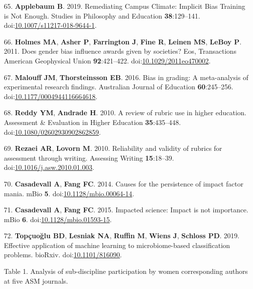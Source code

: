 \documentclass[11pt,]{article}
\begin{document}
\hypertarget{ref-applebaum_remediating_2019}{}
65. \textbf{Applebaum B}. 2019. Remediating Campus Climate: Implicit
Bias Training is Not Enough. Studies in Philosophy and Education
\textbf{38}:129--141.
doi:\href{https://doi.org/10.1007/s11217-018-9644-1}{10.1007/s11217-018-9644-1}.

\hypertarget{ref-Holmes2011}{}
66. \textbf{Holmes MA}, \textbf{Asher P}, \textbf{Farrington J},
\textbf{Fine R}, \textbf{Leinen MS}, \textbf{LeBoy P}. 2011. Does gender
bias influence awards given by societies? Eos, Transactions American
Geophysical Union \textbf{92}:421--422.
doi:\href{https://doi.org/10.1029/2011eo470002}{10.1029/2011eo470002}.

\hypertarget{ref-Malouff2016}{}
67. \textbf{Malouff JM}, \textbf{Thorsteinsson EB}. 2016. Bias in
grading: A meta-analysis of experimental research findings. Australian
Journal of Education \textbf{60}:245--256.
doi:\href{https://doi.org/10.1177/0004944116664618}{10.1177/0004944116664618}.

\hypertarget{ref-Reddy2010}{}
68. \textbf{Reddy YM}, \textbf{Andrade H}. 2010. A review of rubric use
in higher education. Assessment \& Evaluation in Higher Education
\textbf{35}:435--448.
doi:\href{https://doi.org/10.1080/02602930902862859}{10.1080/02602930902862859}.

\hypertarget{ref-Rezaei2010}{}
69. \textbf{Rezaei AR}, \textbf{Lovorn M}. 2010. Reliability and
validity of rubrics for assessment through writing. Assessing Writing
\textbf{15}:18--39.
doi:\href{https://doi.org/10.1016/j.asw.2010.01.003}{10.1016/j.asw.2010.01.003}.

\hypertarget{ref-Casadevall2014}{}
70. \textbf{Casadevall A}, \textbf{Fang FC}. 2014. Causes for the
persistence of impact factor mania. mBio \textbf{5}.
doi:\href{https://doi.org/10.1128/mbio.00064-14}{10.1128/mbio.00064-14}.

\hypertarget{ref-Casadevall2015}{}
71. \textbf{Casadevall A}, \textbf{Fang FC}. 2015. Impacted science:
Impact is not importance. mBio \textbf{6}.
doi:\href{https://doi.org/10.1128/mbio.01593-15}{10.1128/mbio.01593-15}.

\hypertarget{ref-Topcuoglu2019}{}
72. \textbf{Topçuoğlu BD}, \textbf{Lesniak NA}, \textbf{Ruffin M},
\textbf{Wiens J}, \textbf{Schloss PD}. 2019. Effective application of
machine learning to microbiome-based classification problems. bioRxiv.
doi:\href{https://doi.org/10.1101/816090}{10.1101/816090}.

\newpage

Table 1. Analysis of sub-discipline participation by women corresponding
authors at five ASM journals.
\end{document}
